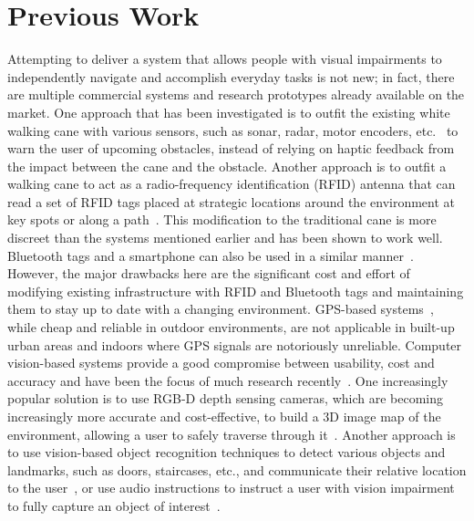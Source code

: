 \documentclass[sigconf, review=true, screen=true, anonymous=true]{acmart}
\begin{document}
\section{Previous Work}\label{sec:lit-review}

Attempting to deliver a system that allows people with visual impairments to independently navigate and accomplish everyday tasks is not new; in fact, there are multiple commercial systems and research prototypes already available on the market.
One approach that has been investigated is to outfit the existing white walking cane with various sensors,
such as sonar, radar, motor encoders, etc.~\cite{ulrich1997, marion2008batcane} to warn the user of upcoming obstacles, instead of relying on haptic feedback from the impact between the cane and the obstacle.
Another approach is to outfit a walking cane to act as a radio-frequency identification (RFID) antenna that can read a set of RFID tags placed at strategic locations around the environment at key spots or along a path~\cite{faria2010electronic, willis2005}.
This modification to the traditional cane is more discreet than the systems mentioned earlier and has been shown to work well.
Bluetooth tags and a smartphone can also be used in a similar manner~\cite{sato2017navcog3}.
However, the major drawbacks here are the significant cost and effort of modifying existing infrastructure with RFID and Bluetooth tags and maintaining them to stay up to date with a changing environment.
GPS-based systems~\cite{ran2004drishti, loomis2001navigating, kammoun2012navigation}, while cheap and reliable in outdoor environments, are not applicable in built-up urban areas and indoors where GPS signals are notoriously unreliable.
Computer vision-based systems provide a good compromise between usability, cost and accuracy and have been the focus of much research recently~\cite{manduchi2014last}.
One increasingly popular solution is to use RGB-D depth sensing cameras, which are becoming increasingly more accurate and cost-effective, to build a 3D image map of the environment, allowing a user to safely traverse through it~\cite{lee2015, rodriguez2012obstacle}.
Another approach is to use vision-based object recognition techniques to detect various objects and landmarks, such as doors, staircases, etc., and communicate their relative location to the user~\cite{schauerte2012assistive, tian2013b, fiannaca2014headlock}, or use audio instructions to instruct a user with vision impairment to fully capture an object of interest~\cite{vazquez2012helping}. 
\end{document}
